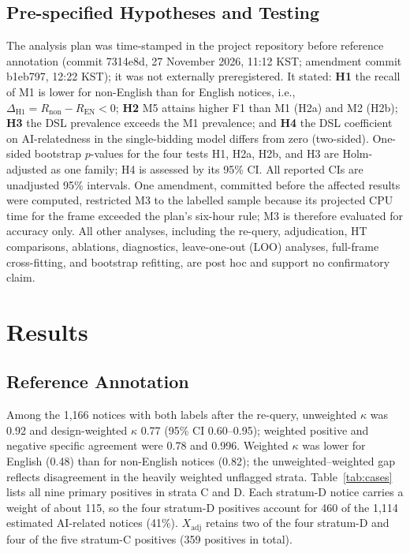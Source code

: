 \documentclass[runningheads]{llncs}
\begin{document}
\subsection{Pre-specified Hypotheses and Testing}
The analysis plan was time-stamped in the project repository before reference annotation (commit 7314e8d, 27 November 2026, 11:12 KST; amendment commit b1eb797, 12:22 KST); it was not externally preregistered. It stated: \textbf{H1} the recall of M1 is lower for non-English than for English notices, i.e., $\Delta_{\mathrm{H1}}=R_{\mathrm{non}}-R_{\mathrm{EN}}<0$; \textbf{H2} M5 attains higher F1 than M1 (H2a) and M2 (H2b); \textbf{H3} the DSL prevalence exceeds the M1 prevalence; and \textbf{H4} the DSL coefficient on AI-relatedness in the single-bidding model differs from zero (two-sided). One-sided bootstrap $p$-values for the four tests H1, H2a, H2b, and H3 are Holm-adjusted as one family; H4 is assessed by its 95\% CI. All reported CIs are unadjusted 95\% intervals. One amendment, committed before the affected results were computed, restricted M3 to the labelled sample because its projected CPU time for the frame exceeded the plan's six-hour rule; M3 is therefore evaluated for accuracy only. All other analyses, including the re-query, adjudication, HT comparisons, ablations, diagnostics, leave-one-out (LOO) analyses, full-frame cross-fitting, and bootstrap refitting, are post hoc and support no confirmatory claim.

\section{Results}
\subsection{Reference Annotation}
Among the 1,166 notices with both labels after the re-query, unweighted $\kappa$ was 0.92 and design-weighted $\kappa$ 0.77 (95\% CI 0.60--0.95); weighted positive and negative specific agreement were 0.78 and 0.996. Weighted $\kappa$ was lower for English (0.48) than for non-English notices (0.82); the unweighted--weighted gap reflects disagreement in the heavily weighted unflagged strata. Table~\ref{tab:cases} lists all nine primary positives in strata C and D. Each stratum-D notice carries a weight of about 115, so the four stratum-D positives account for 460 of the 1,114 estimated AI-related notices (41\%). $X_{\mathrm{adj}}$ retains two of the four stratum-D and four of the five stratum-C positives (359 positives in total).
\end{document}
